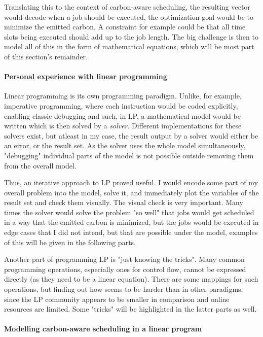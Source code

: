 Translating this to the context of carbon-aware scheduling, the resulting vector would decode when a job should be executed, the optimization goal would be to minimize the emitted carbon. 
A constraint for example could be that all time slots being executed should add up to the job length. 
The big challenge is then to model all of this in the form of mathematical equations, which will be most part of this section's remainder.

\paragraph{Personal experience with linear programming}

Linear programming is its own programming paradigm. Unlike, for example, imperative programming, where each instruction would be coded explicitly, enabling classic debugging and such, in LP, a mathematical model would be written which is then solved by a \emph{solver}. 
Different implementations for these solvers exist, but atleast in my case, the result output by a solver would either be an error, or the result set. 
As the solver uses the whole model simultaneously, "debugging" individual parts of the model is not possible outside removing them from the overall model.

Thus, an iterative approach to LP proved useful. 
I would encode some part of my overall problem into the model, solve it, and immediately plot the variables of the result set and check them visually.
The visual check is very important. 
Many times the solver would solve the problem "so well" that jobs would get scheduled in a way that the emitted carbon is minimized, but the jobs would be executed in edge cases that I did not intend, but that are possible under the model, examples of this will be given in the following parts.

Another part of programming LP is "just knowing the tricks". 
Many common programming operations, especially ones for control flow, cannot be expressed directly (as they need to be a linear equation).
There are some mappings for such operations, but finding out how seems to be harder than in other paradigms, since the LP community appears to be smaller in comparison and online resources are limited.
Some "tricks" will be highlighted in the latter parts as well. 

\paragraph{Modelling carbon-aware scheduling in a linear program}

